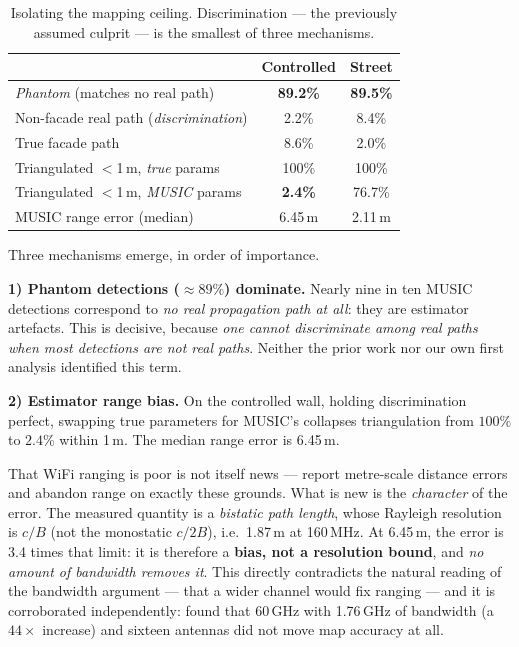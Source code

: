 \documentclass[journal]{IEEEtran}
\newcommand{\SI}[2]{#1\,#2}
\newcommand{\num}[1]{#1}
\begin{document}
\begin{table}[t]
\caption{Isolating the mapping ceiling. Discrimination --- the previously assumed
culprit --- is the smallest of three mechanisms.}
\label{tab:ceiling}
\centering
\footnotesize
\begin{tabular}{lcc}
\toprule
 & Controlled & Street \\
\midrule
\emph{Phantom} (matches no real path)      & \textbf{89.2\%} & \textbf{89.5\%} \\
Non-facade real path (\emph{discrimination}) & 2.2\% & 8.4\% \\
True facade path                            & 8.6\% & 2.0\% \\
\midrule
Triangulated $<$\SI{1}{m}, \emph{true} params  & 100\% & 100\% \\
Triangulated $<$\SI{1}{m}, \emph{MUSIC} params & \textbf{2.4\%} & 76.7\% \\
MUSIC range error (median)                     & \SI{6.45}{m} & \SI{2.11}{m} \\
\bottomrule
\end{tabular}
\end{table}

Three mechanisms emerge, in order of importance.

\textbf{1) Phantom detections ($\approx89\%$) dominate.} Nearly nine in ten MUSIC
detections correspond to \emph{no real propagation path at all}: they are estimator
artefacts. This is decisive, because \emph{one cannot discriminate among real paths when
most detections are not real paths}. Neither the prior work nor our own first analysis
identified this term.

\textbf{2) Estimator range bias.} On the controlled wall, holding discrimination perfect,
swapping true parameters for MUSIC's collapses triangulation from $100\%$ to $2.4\%$ within
\SI{1}{m}. The median range error is \SI{6.45}{m}.

That WiFi ranging is poor is not itself news --- \cite{li2021csipwr} report metre-scale
distance errors and abandon range on exactly these grounds. What is new is the
\emph{character} of the error. The measured quantity is a \emph{bistatic path length}, whose
Rayleigh resolution is $c/B$ (not the monostatic $c/2B$), i.e.\ \SI{1.87}{m} at \SI{160}{MHz}.
At \SI{6.45}{m}, the error is \num{3.4} times that limit: it is therefore a
\textbf{bias, not a resolution bound},
and \emph{no amount of bandwidth removes it}. This directly contradicts the natural reading of
the bandwidth argument --- that a wider channel would fix ranging --- and it is corroborated
independently: \cite{fetna2026wifiradar} found that \SI{60}{GHz} with \SI{1.76}{GHz} of
bandwidth (a $44\times$ increase) and sixteen antennas did not move map accuracy at all.
\end{document}
